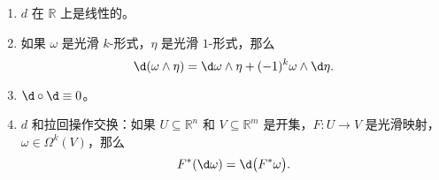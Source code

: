 \begin{proposition}\label{prop:property of d}
  \mbox{}
  \begin{enumerate}
    \item $d$ 在 $\mathbb{R}$ 上是线性的。
    \item 如果 $\omega$ 是光滑 $k$-形式，$\eta$ 是光滑 $1$-形式，那么
    \[
      \d(\omega\wedge\eta)=  \d\omega\wedge\eta+(-1)^k\omega\wedge\d \eta.
    \]
    \item $\d\circ\d \equiv 0$。
    \item $d$ 和拉回操作交换：如果 $U\subseteq \mathbb{R}^n$ 和 $V\subseteq \mathbb{R}^m$
    是开集，$F:U\to V$ 是光滑映射，$\omega\in\Omega^k(V)$，那么
    \begin{equation}
      F^*(\d\omega)=\d\bigl(F^*\omega\bigr).
    \end{equation}
  \end{enumerate}
\end{proposition}

